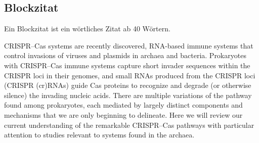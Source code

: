 \subsection{Blockzitat}
\noindent Ein Blockzitat ist ein wörtliches Zitat ab 40 Wörtern.
\begin{Blockzitat}
    CRISPR–Cas systems are recently discovered, RNA-based immune systems that 
    control invasions of viruses and plasmids in archaea and bacteria. Prokaryotes 
    with CRISPR–Cas immune systems capture short invader sequences within the 
    CRISPR loci in their genomes, and small RNAs produced from the CRISPR loci 
    (CRISPR (cr)RNAs) guide Cas proteins to recognize and degrade (or otherwise 
    silence) the invading nucleic acids. There are multiple variations of the 
    pathway found among prokaryotes, each mediated by largely distinct components 
    and mechanisms that we are only beginning to delineate. Here we will review our 
    current understanding of the remarkable CRISPR–Cas pathways with particular 
    attention to studies relevant to systems found in the archaea. 
    \parencite{TERNS2011321}
\end{Blockzitat}